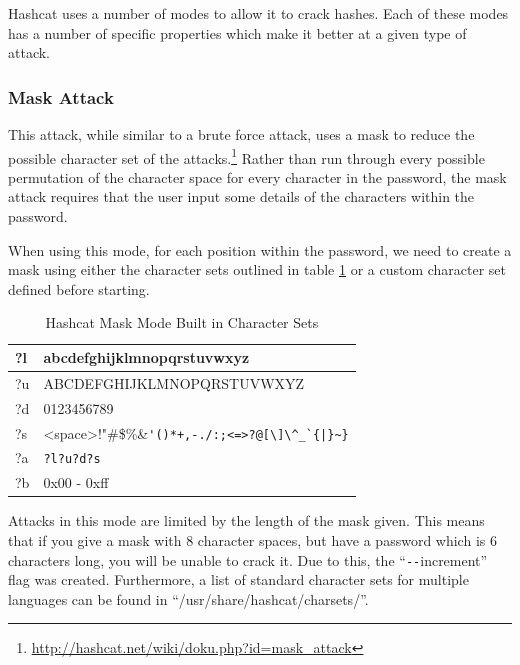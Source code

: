 			Hashcat uses a number of modes to allow it to crack hashes. 
			Each of these modes has a number of specific properties which make it better at a given type of attack. 

			\subsubsection{Mask Attack}
				This attack, while similar to a brute force attack, uses a mask to reduce the possible character set of the attacks.\footnote{\url{http://hashcat.net/wiki/doku.php?id=mask_attack}} 
				Rather than run through every possible permutation of the character space for every character in the password, the mask attack requires that the user input some details of the characters within the password. 
				
				When using this mode, for each position within the password, we need to create a mask using either the character sets outlined in table \ref{tab:HashcatMaskCharSets} or a custom character set defined before starting. 
				\begin{table}[htb]
					\centering
				\begin{adjustbox}{max width=1\textwidth}
					\begin{tabular}{| l | l |}
						\hline
						?l & abcdefghijklmnopqrstuvwxyz \\ \hline
						?u & ABCDEFGHIJKLMNOPQRSTUVWXYZ \\ \hline
						?d & 0123456789 \\ \hline
						?s & <space>!"\#\$\%\&\verb!'()*+,-./:;<=>?@[\]\^_`{|}~}! \\ \hline
						?a & \verb+?l?u?d?s+ \\ \hline
						?b & 0x00 - 0xff \\ \hline
					\end{tabular}
				\end{adjustbox}
					\caption{Hashcat Mask Mode Built in Character Sets}
					\label{tab:HashcatMaskCharSets}
				\end{table}
				Attacks in this mode are limited by the length of the mask given. 
				This means that if you give a mask with 8 character spaces, but have a password which is 6 characters long, you will be unable to crack it. 
				Due to this, the ``\verb+--+increment'' flag was created. 
				Furthermore, a list of standard character sets for multiple languages can be found in ``/usr/share/hashcat/charsets/''.

